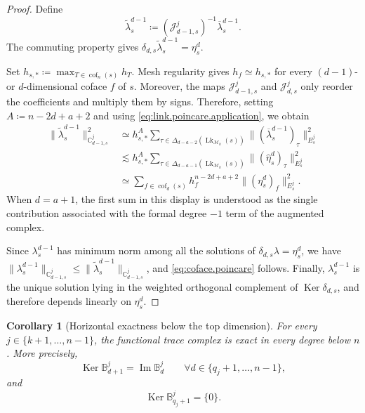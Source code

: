 \documentclass[a4paper,11pt]{article}
\newtheorem{corollary}[theorem]{Corollary}
\theoremstyle{definition}
\newcommand{\Mh}{\mathcal{M}_h}
\newcommand{\FM}[1]{\Delta_{#1}}
\newcommand{\cof}[1]{\operatorname{cof}_{#1}}
\newcommand{\Ker}{\operatorname{Ker}}
\begin{document}
\begin{proof}
Define
\[
  \widetilde\lambda_s^{d-1}
  \coloneqq
  \left(\mathcal J_{d-1,s}^j\right)^{-1}
  \overline\lambda_s^{d-1}.
\]
The commuting property gives $\delta_{d,s}\widetilde\lambda_s^{d-1}=\eta_s^d$.

Set $h_{s,*}\coloneqq\max_{T\in\cof{n}(s)}h_T$.
Mesh regularity gives $h_f\simeq h_{s,*}$ for every $(d-1)$- or $d$-dimensional coface $f$ of $s$.
Moreover, the maps $\mathcal J_{d-1,s}^j$ and $\mathcal J_{d,s}^j$ only reorder the coefficients and multiply them by signs.
Therefore, setting $A\coloneqq n-2d+a+2$ and using \eqref{eq:link.poincare.application}, we obtain
\[
\begin{aligned}
\|\widetilde\lambda_s^{d-1}\|_{\mathbb C_{d-1,s}^j}^2
&\simeq
h_{s,*}^{A}
\sum_{\tau\in
\FM{d-a-2}(\operatorname{Lk}_{\Mh}(s))}
\|(\overline\lambda_s^{d-1})_\tau\|_{E_s^j}^2
\\
&\lesssim
h_{s,*}^{A}
\sum_{\tau\in
\FM{d-a-1}(\operatorname{Lk}_{\Mh}(s))}
\|(\widehat\eta_s^d)_\tau\|_{E_s^j}^2
\\
&\simeq
\sum_{f\in\cof{d}(s)}
h_f^{n-2d+a+2}
\|(\eta_s^d)_f\|_{E_s^j}^2.
\end{aligned}
\]
When $d=a+1$, the first sum in this display is understood as the single contribution associated with the formal degree $-1$ term of the augmented complex.

Since $\lambda_s^{d-1}$ has minimum norm among all the solutions of $\delta_{d,s}\lambda=\eta_s^d$, we have $\|\lambda_s^{d-1}\|_{\mathbb C_{d-1,s}^j} \leq \|\widetilde\lambda_s^{d-1}\|_{\mathbb C_{d-1,s}^j}$, and \eqref{eq:coface.poincare} follows.
Finally, $\lambda_s^{d-1}$ is the unique solution lying in the weighted orthogonal complement of $\Ker\delta_{d,s}$, and therefore depends linearly on $\eta_s^d$.
\end{proof}

\begin{corollary}[Horizontal exactness below the top dimension]
\label{cor:functional.horizontal.exactness}
For every $j\in\{k+1,\ldots,n-1\}$, the functional trace complex is exact in every degree below $n$.
More precisely,
\begin{equation}\label{eq:functional.horizontal.exactness}
  \Ker\mathbb B_{d+1}^j
  =
  \operatorname{Im}\mathbb B_d^j
  \qquad
  \forall d\in\{q_j+1,\ldots,n-1\},
\end{equation}
and
\begin{equation}\label{eq:functional.first.injectivity}
  \Ker\mathbb B_{q_j+1}^j
  =
  \{0\}.
\end{equation}
\end{corollary}
\end{document}
